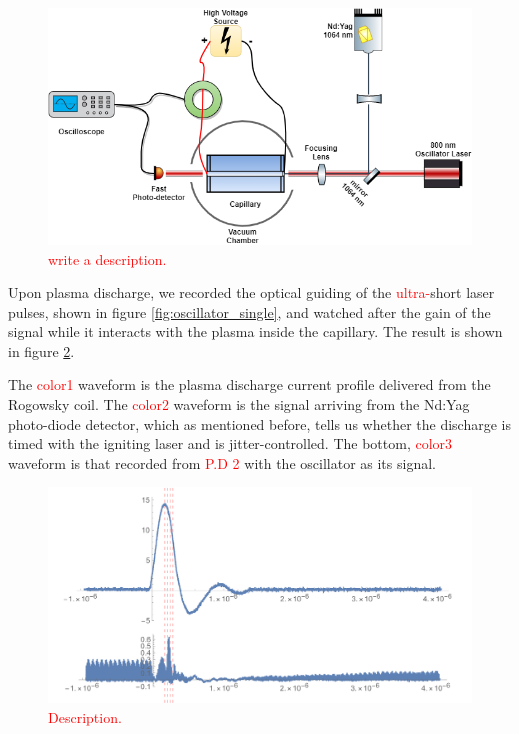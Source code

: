 \documentclass[justified,nofonts,nobib,openany]{tufte-book}
\begin{document}
\begin{figure}
\centering \includegraphics[width=\textwidth]{figures/oscillator.png}
\caption{\textcolor{red}{write a description.}}
\label{fig:oscillator}
\end{figure}
Upon plasma discharge, we recorded the optical guiding of the \textcolor{red}{ultra-}short laser pulses, shown in figure  \ref{fig:oscillator_single}, and watched after the gain of the signal while it interacts with the plasma inside the capillary. The result is shown in figure \ref{fig:oscillator_gain}.

The \textcolor{red}{color1} waveform is the plasma discharge current profile delivered from the Rogowsky coil. The \textcolor{red}{color2} waveform is the signal arriving from the Nd:Yag photo-diode detector, which as mentioned before, tells us whether the discharge is timed with the igniting laser and is jitter-controlled. The bottom, \textcolor{red}{color3} waveform is that recorded from \textcolor{red}{P.D 2} with the oscillator as its signal.
\begin{figure}
    \centering
    \includegraphics[width=\textwidth]{figures/oscillator/guiding.pdf}
    \caption{\textcolor{red}{Description.}}
    \label{fig:oscillator_gain}
\end{figure}
\end{document}
